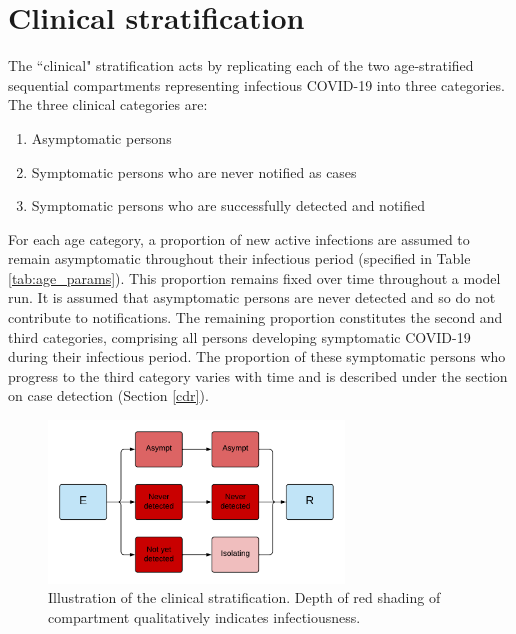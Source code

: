\section{Clinical stratification} \label{clin}
The ``clinical" stratification acts by replicating each of the two age-stratified sequential compartments representing infectious COVID-19 into three categories.
The three clinical categories are:
\begin{enumerate}
    \item Asymptomatic persons
    \item Symptomatic persons who are never notified as cases
    \item Symptomatic persons who are successfully detected and notified
\end{enumerate}
For each age category, a proportion of new active infections are assumed to remain asymptomatic throughout their infectious period (specified in Table \ref{tab:age_params}).
This proportion remains fixed over time throughout a model run.
It is assumed that asymptomatic persons are never detected and so do not contribute to notifications.
The remaining proportion constitutes the second and third categories, comprising all persons developing symptomatic COVID-19 during their infectious period.
The proportion of these symptomatic persons who progress to the third category varies with time and is described under the section on case detection (Section \ref{cdr}).
\begin{figure}[ht]
    \begin{center}
    \includegraphics[width=0.7\textwidth]{../../tex_descriptions/models/sm_sir/stratifications/clinical_strat.pdf}
    \end{center}
    \caption{Illustration of the clinical stratification. \small Depth of red shading of compartment qualitatively indicates infectiousness.}
    \label{fig:seeiir}
\end{figure}